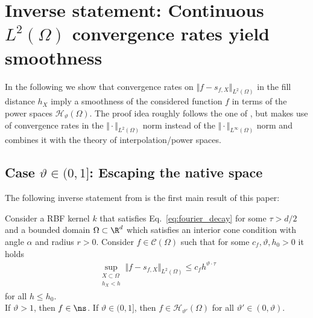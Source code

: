\documentclass[a4paper, 10pt]{article}
\newcommand{\Ht}{\mathcal{H}_{\vartheta}}
\begin{document}
%
%
%
%
%
%
%
%
%
%







%
%
%


%
%
%
%
%
%
%
%
%
%
%
%
%
%
%
%
%
%
%
%
%
%
%
%
%
%
%
%
%
%
%
%
%
%
%
%
%
%
%
%
%
%
%
%
%
%
%
%
%
%
%
%
%
%
%
%
%
%
%
%
%
%
%
%
%
%
%






\section{Inverse statement: Continuous $L^2(\Omega)$ convergence rates yield smoothness} \label{sec:inverse_statement}

In the following we show that convergence rates on $\Vert f - s_{f, X} \Vert_{L^2(\Omega)}$ in the fill distance $h_X$ imply a smoothness of the considered function $f$ in terms of the power spaces $\Ht(\Omega)$.
The proof idea roughly follows the one of \cite[Theorem 6.1]{schaback2002inverse}, 
but makes use of convergence rates in the $\Vert \cdot \Vert_{L^2(\Omega)}$ norm instead of the $\Vert \cdot \Vert_{L^\infty(\Omega)}$ norm and combines it with the theory of interpolation/power spaces.

%
%
%
%

\subsection{Case $\vartheta \in (0, 1]$: Escaping the native space} \label{subsec:vartheta_case_1}

The following inverse statement from  is the first main result of this paper:

\begin{theorem}
\label{th:inverse_statement_generalized}
Consider a RBF kernel $k$ that satisfies Eq.\ \eqref{eq:fourier_decay} for some $\tau > d/2$ and a bounded domain $\Omega \subset \R^d$ which satisfies an interior cone condition with angle $\alpha$ and radius $r>0$.
Consider $f \in \mathcal{C}(\Omega)$ such that for some $c_f, \vartheta, h_0 > 0$ it holds
\begin{align}
\label{eq:inverse_statement_assumption}
\sup_{\substack{X \subset \Omega \\ h_X < h}} \Vert f - s_{f, X} \Vert_{L^2(\Omega)} \leq c_f h^{\vartheta \cdot \tau}
\end{align}
for all $h \leq h_0$. \\
If $\vartheta > 1$, then $f \in \ns$. If $\vartheta \in (0, 1]$,
then $f \in \mathcal{H}_{\vartheta'}(\Omega)$ for all $\vartheta' \in (0, \vartheta)$.
\end{theorem}
\end{document}
